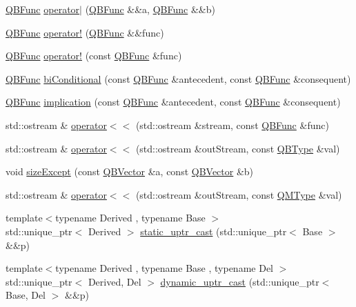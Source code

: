 \begin{DoxyCompactItemize}
\hyperlink{classQuickMath_1_1QBFunc}{Q\+B\+Func} \hyperlink{namespaceQuickMath_aa413789d3b94a244c44f299ef5a78263}{operator$\vert$} (\hyperlink{classQuickMath_1_1QBFunc}{Q\+B\+Func} \&\&a, \hyperlink{classQuickMath_1_1QBFunc}{Q\+B\+Func} \&\&b)
\item 
\hyperlink{classQuickMath_1_1QBFunc}{Q\+B\+Func} \hyperlink{namespaceQuickMath_ac36c6320d00beed93ef8c2ac6bd3aaef}{operator!} (\hyperlink{classQuickMath_1_1QBFunc}{Q\+B\+Func} \&\&func)
\item 
\hyperlink{classQuickMath_1_1QBFunc}{Q\+B\+Func} \hyperlink{namespaceQuickMath_a1ea351bc77b0bd960f46b60c840ad802}{operator!} (const \hyperlink{classQuickMath_1_1QBFunc}{Q\+B\+Func} \&func)
\item 
\hyperlink{classQuickMath_1_1QBFunc}{Q\+B\+Func} \hyperlink{namespaceQuickMath_a562454d93f506c2c33956c06bce5cf6f}{bi\+Conditional} (const \hyperlink{classQuickMath_1_1QBFunc}{Q\+B\+Func} \&antecedent, const \hyperlink{classQuickMath_1_1QBFunc}{Q\+B\+Func} \&consequent)
\item 
\hyperlink{classQuickMath_1_1QBFunc}{Q\+B\+Func} \hyperlink{namespaceQuickMath_a8ac0fc1b71f36ab95d586eec93254ba5}{implication} (const \hyperlink{classQuickMath_1_1QBFunc}{Q\+B\+Func} \&antecedent, const \hyperlink{classQuickMath_1_1QBFunc}{Q\+B\+Func} \&consequent)
\item 
std\+::ostream \& \hyperlink{namespaceQuickMath_ad40e44735b0edd64ad8308122141be65}{operator$<$$<$} (std\+::ostream \&stream, const \hyperlink{classQuickMath_1_1QBFunc}{Q\+B\+Func} \&func)
\item 
std\+::ostream \& \hyperlink{namespaceQuickMath_acccbe8c3ec70f9e42b0da4125351f905}{operator$<$$<$} (std\+::ostream \&out\+Stream, const \hyperlink{classQuickMath_1_1QBType}{Q\+B\+Type} \&val)
\item 
void \hyperlink{namespaceQuickMath_ae4685b904b3bdbb20d382b6ed2bc51ac}{size\+Except} (const \hyperlink{classQuickMath_1_1QBVector}{Q\+B\+Vector} \&a, const \hyperlink{classQuickMath_1_1QBVector}{Q\+B\+Vector} \&b)
\item 
std\+::ostream \& \hyperlink{namespaceQuickMath_a6c2aa1092f6da9cc08f02d1456ee129a}{operator$<$$<$} (std\+::ostream \&out\+Stream, const \hyperlink{classQuickMath_1_1QMType}{Q\+M\+Type} \&val)
\item 
{\footnotesize template$<$typename Derived , typename Base $>$ }\\std\+::unique\+\_\+ptr$<$ Derived $>$ \hyperlink{namespaceQuickMath_ae96dd5e8f317ec3047ca4daf0e95c53c}{static\+\_\+uptr\+\_\+cast} (std\+::unique\+\_\+ptr$<$ Base $>$ \&\&p)
\item 
{\footnotesize template$<$typename Derived , typename Base , typename Del $>$ }\\std\+::unique\+\_\+ptr$<$ Derived, Del $>$ \hyperlink{namespaceQuickMath_afd2de1a5f61fb3f1eba5a9e84117f72a}{dynamic\+\_\+uptr\+\_\+cast} (std\+::unique\+\_\+ptr$<$ Base, Del $>$ \&\&p)
\end{DoxyCompactItemize}


